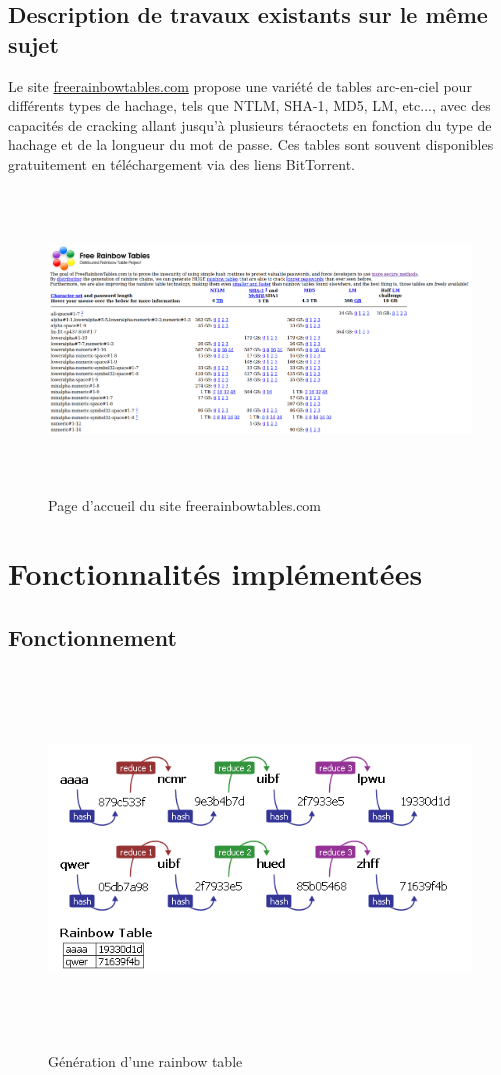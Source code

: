 \documentclass[a4paper,12pt]{article}
\begin{document}
\subsection{Description de travaux existants sur le même sujet}
Le site \href{https://freerainbowtables.com/}{freerainbowtables.com} propose une variété de tables arc-en-ciel pour différents types de hachage, tels que NTLM, SHA-1, MD5, LM, etc..., avec des capacités de cracking allant jusqu'à plusieurs téraoctets en fonction du type de hachage et de la longueur du mot de passe. Ces tables sont souvent disponibles gratuitement en téléchargement via des liens BitTorrent.
\begin{figure}[H]
\centering
\includegraphics[height=8cm]{img/freerainbowtables.png}
\caption{Page d'accueil du site freerainbowtables.com}
\end{figure}

\section{Fonctionnalités implémentées}
\subsection{Fonctionnement}

\begin{figure}[H]
\centering
\includegraphics[height=10cm]{img/fonctionnement.png}
\caption{Génération d’une rainbow table}
\end{figure}
\end{document}
